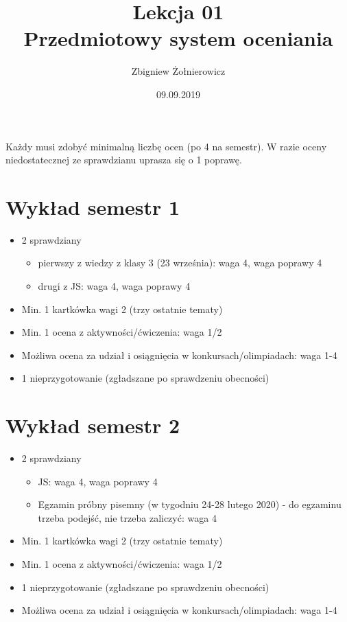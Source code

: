 \documentclass[a4paper]{article}
\begin{document}
\title{{\huge Lekcja 01} \\
    {\large Przedmiotowy system oceniania}}
\author{Zbigniew Żołnierowicz}
\date{09.09.2019}
\maketitle
Każdy musi zdobyć minimalną liczbę ocen (po 4 na semestr). W razie oceny niedostatecznej ze sprawdzianu uprasza się o 1 poprawę.
\section*{Wykład semestr 1}
\begin{itemize}
    \item 2 sprawdziany \begin{itemize}
        \item pierwszy z wiedzy z klasy 3 (23 września): waga 4, waga poprawy 4
        \item drugi z JS: waga 4, waga poprawy 4
    \end{itemize}
    \item Min. 1 kartkówka wagi 2 (trzy ostatnie tematy)
    \item Min. 1 ocena z aktywności/ćwiczenia: waga 1/2
    \item Możliwa ocena za udział i osiągnięcia w konkursach/olimpiadach: waga 1-4
    \item 1 nieprzygotowanie (zgładszane po sprawdzeniu obecności)
\end{itemize}
\section*{Wykład semestr 2}
\begin{itemize}
    \item 2 sprawdziany \begin{itemize}
        \item JS: waga 4, waga poprawy 4
        \item Egzamin próbny pisemny (w tygodniu 24-28 lutego 2020) - do egzaminu trzeba podejść, nie trzeba zaliczyć: waga 4
    \end{itemize}
    \item Min. 1 kartkówka wagi 2 (trzy ostatnie tematy)
    \item Min. 1 ocena z aktywności/ćwiczenia: waga 1/2
    \item 1 nieprzygotowanie (zgładszane po sprawdzeniu obecności)
    \item Możliwa ocena za udział i osiągnięcia w konkursach/olimpiadach: waga 1-4
\end{itemize}
\end{document}
